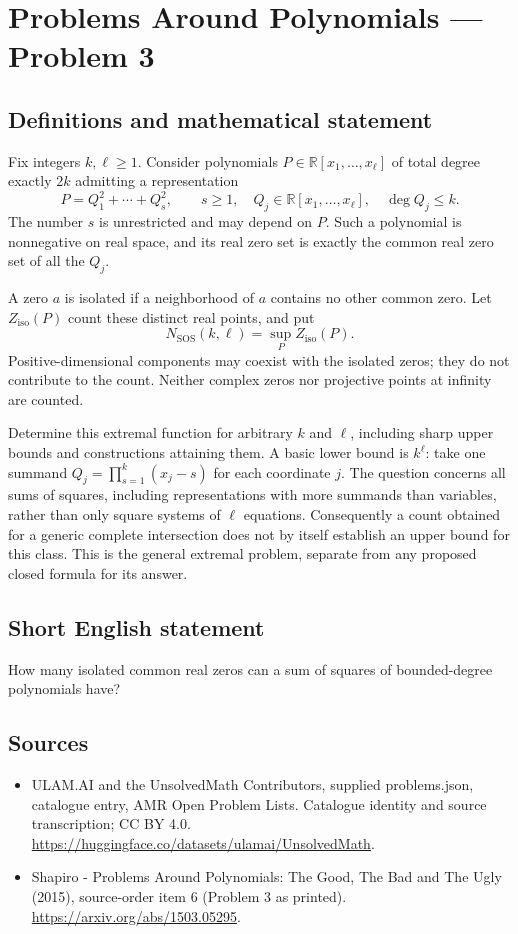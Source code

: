 \documentclass[11pt,a4paper]{article}
\begin{document}
\section*{Problems Around Polynomials — Problem 3}\label{statement}

\subsection{Definitions and mathematical statement}
Fix integers $k,\ell\geq1$. Consider polynomials $P\in
\mathbb R[x_1,\ldots,x_\ell]$ of total degree exactly $2k$ admitting a
representation
\[
 P=Q_1^2+\cdots+Q_s^2,\qquad
 s\geq1,\quad Q_j\in\mathbb R[x_1,\ldots,x_\ell],\quad \deg Q_j\leq k.
\]
The number $s$ is unrestricted and may depend on $P$. Such a polynomial
is nonnegative on real space, and its real zero set is exactly the
common real zero set of all the $Q_j$.

A zero $a$ is isolated if a neighborhood of $a$ contains no other common
zero. Let $Z_{\mathrm{iso}}(P)$ count these distinct real points, and put
\[
 N_{\mathrm{SOS}}(k,\ell)
   =\sup_P Z_{\mathrm{iso}}(P).
\]
Positive-dimensional components may coexist with the isolated zeros;
they do not contribute to the count. Neither complex zeros nor
projective points at infinity are counted.

Determine this extremal function for arbitrary $k$ and $\ell$, including
sharp upper bounds and constructions attaining them. A basic lower
bound is $k^\ell$: take one summand
$Q_j=\prod_{s=1}^{k}(x_j-s)$ for each coordinate $j$.
The question concerns all sums of squares, including representations
with more summands than variables, rather than only square systems
of $\ell$ equations. Consequently a count obtained for a generic
complete intersection does not by itself establish an upper bound
for this class. This is the general extremal problem, separate from
any proposed closed formula for its answer.
\subsection{Short English statement}
How many isolated common real zeros can a sum of squares of bounded-degree polynomials have?
\subsection{Sources}
\begin{itemize}
\item[S1] ULAM.AI and the UnsolvedMath Contributors, supplied problems.json, catalogue entry, AMR Open Problem Lists. Catalogue identity and source transcription; CC BY 4.0.
\url{https://huggingface.co/datasets/ulamai/UnsolvedMath}.
\item[S2] Shapiro - Problems Around Polynomials: The Good, The Bad and The Ugly (2015), source-order item 6 (Problem 3 as printed). 
\url{https://arxiv.org/abs/1503.05295}.
\end{itemize}
\end{document}

